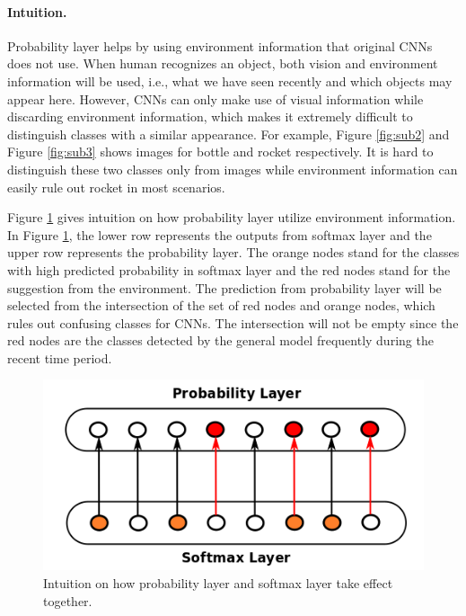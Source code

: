 \documentclass[pageno]{jpaper}
\begin{document}
\paragraph{Intuition.}
Probability layer helps by using environment information that original CNNs does not use. When human recognizes an object, both vision and environment information will be used, i.e., what we have seen recently and which objects may appear here. However, CNNs can only make use of visual information while discarding environment information, which makes it extremely difficult to distinguish classes with a similar appearance. For example, Figure \ref{fig:sub2} and Figure \ref{fig:sub3} shows images for bottle and rocket respectively. It is hard to distinguish these two classes only from images while environment information can easily rule out rocket in most scenarios. 

Figure \ref{fig:intuition} gives intuition on how probability layer utilize environment information. In Figure \ref{fig:intuition}, the lower row represents the outputs from softmax layer and the upper row represents the probability layer. The orange nodes stand for the classes with high predicted probability in softmax layer and the red nodes stand for the suggestion from the environment. The prediction from probability layer will be selected from the intersection of the set of red nodes and orange nodes, which rules out confusing classes for CNNs. The intersection will not be empty since the red nodes are the classes detected by the general model frequently during the recent time period.


\begin{figure}
  \centering
  \includegraphics[width=.45\textwidth]{intuition.png}
\caption{Intuition on how probability layer and softmax layer take effect together.}
  \label{fig:intuition}

\end{figure}
\end{document}
